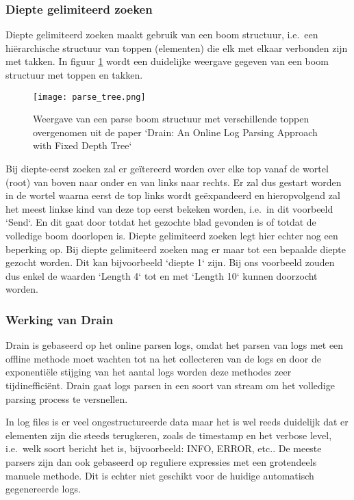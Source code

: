 \subsubsection{Diepte gelimiteerd zoeken}
Diepte gelimiteerd zoeken maakt gebruik van een boom structuur, i.e.\ een hiërarchische structuur van toppen (elementen) die elk met elkaar verbonden zijn met takken. In figuur \ref{pic:Drainparseboom} wordt een duidelijke weergave gegeven van een boom structuur met toppen en takken.

\begin{figure}[!htp]
    \texttt{[image: parse\_tree.png]}
    \caption{Weergave van een parse boom structuur met verschillende toppen overgenomen uit de paper `Drain: An Online Log Parsing Approach with Fixed Depth Tree`~\autocite{he2017drain}}
    \label{pic:Drainparseboom}
\end{figure}

Bij diepte-eerst zoeken zal er geïtereerd worden over elke top vanaf de wortel (root) van boven naar onder en van links naar rechts. Er zal dus gestart worden in de wortel waarna eerst de top links wordt geëxpandeerd en hieropvolgend zal het meest linkse kind van deze top eerst bekeken worden, i.e.\ in dit voorbeeld `Send`. En dit gaat door totdat het gezochte blad gevonden is of totdat de volledige boom doorlopen is. Diepte gelimiteerd zoeken legt hier echter nog een beperking op. Bij diepte gelimiteerd zoeken mag er maar tot een bepaalde diepte gezocht worden. Dit kan bijvoorbeeld `diepte 1` zijn. Bij ons voorbeeld zouden dus enkel de waarden `Length 4` tot en met `Length 10` kunnen doorzocht worden. 

\subsubsection{Werking van Drain}
Drain is gebaseerd op het online parsen logs, omdat het parsen van logs met een offline methode moet wachten tot na het collecteren van de logs en door de exponentiële stijging van het aantal logs worden deze methodes zeer tijdinefficiënt. Drain gaat logs parsen in een soort van stream om het volledige parsing process te versnellen. 

In log files is er veel ongestructureerde data maar het is wel reeds duidelijk dat er elementen zijn die steeds terugkeren, zoals de timestamp en het verbose level, i.e.\ welk soort bericht het is, bijvoorbeeld: INFO, ERROR, etc.. De meeste parsers zijn dan ook gebaseerd op reguliere expressies met een grotendeels manuele methode. Dit is echter niet geschikt voor de huidige automatisch gegenereerde logs. 

